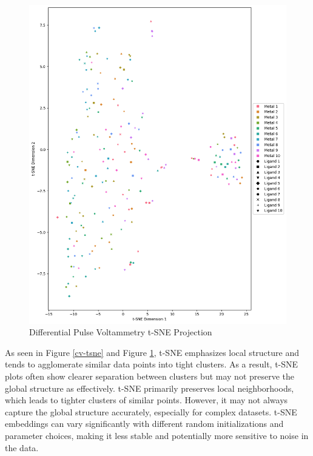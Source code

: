 \begin{figure}[h!]
  \centering
    \includegraphics[width=1.0\textwidth]{figures/dpv_tsne.png}
    \caption{Differential Pulse Voltammetry t-SNE Projection}
    \label{dpv-tsne}
\end{figure}
As seen in Figure \ref{cv-tsne} and Figure \ref{dpv-tsne}, t-SNE emphasizes local structure and tends to agglomerate similar data points into tight clusters. As a result, t-SNE plots often show clearer separation between clusters but may not preserve the global structure as effectively. t-SNE primarily preserves local neighborhoods, which leads to tighter clusters of similar points. However, it may not always capture the global structure accurately, especially for complex datasets. t-SNE embeddings can vary significantly with different random initializations and parameter choices, making it less stable and potentially more sensitive to noise in the data. 
